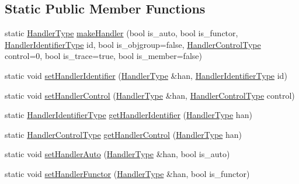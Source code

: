 \subsection*{Static Public Member Functions}
\begin{DoxyCompactItemize}
\item 
static \hyperlink{namespacevt_af64846b57dfcaf104da3ef6967917573}{Handler\+Type} \hyperlink{structvt_1_1_handler_manager_afcfe366a62c35d4fc843fd30f884968d}{make\+Handler} (bool is\+\_\+auto, bool is\+\_\+functor, \hyperlink{namespacevt_a59ae068fe828d1c33051ff96f3d016b6}{Handler\+Identifier\+Type} id, bool is\+\_\+objgroup=false, \hyperlink{namespacevt_adbbef13b92f0a93b14c219b7cc8a48f2}{Handler\+Control\+Type} control=0, bool is\+\_\+trace=true, bool is\+\_\+member=false)
\item 
static void \hyperlink{structvt_1_1_handler_manager_a5501e67dbd88836fecdf434548de0909}{set\+Handler\+Identifier} (\hyperlink{namespacevt_af64846b57dfcaf104da3ef6967917573}{Handler\+Type} \&han, \hyperlink{namespacevt_a59ae068fe828d1c33051ff96f3d016b6}{Handler\+Identifier\+Type} id)
\item 
static void \hyperlink{structvt_1_1_handler_manager_a8cfa04599d2bd111f1197b7bf2343a05}{set\+Handler\+Control} (\hyperlink{namespacevt_af64846b57dfcaf104da3ef6967917573}{Handler\+Type} \&han, \hyperlink{namespacevt_adbbef13b92f0a93b14c219b7cc8a48f2}{Handler\+Control\+Type} control)
\item 
static \hyperlink{namespacevt_a59ae068fe828d1c33051ff96f3d016b6}{Handler\+Identifier\+Type} \hyperlink{structvt_1_1_handler_manager_a1fc8635a26795f11f16f47eaf74b25a7}{get\+Handler\+Identifier} (\hyperlink{namespacevt_af64846b57dfcaf104da3ef6967917573}{Handler\+Type} han)
\item 
static \hyperlink{namespacevt_adbbef13b92f0a93b14c219b7cc8a48f2}{Handler\+Control\+Type} \hyperlink{structvt_1_1_handler_manager_a90bf2b080d44af243e5a35bf8836d161}{get\+Handler\+Control} (\hyperlink{namespacevt_af64846b57dfcaf104da3ef6967917573}{Handler\+Type} han)
\item 
static void \hyperlink{structvt_1_1_handler_manager_a9100f9e0e946b58d98d104a5cbcf5574}{set\+Handler\+Auto} (\hyperlink{namespacevt_af64846b57dfcaf104da3ef6967917573}{Handler\+Type} \&han, bool is\+\_\+auto)
\item 
static void \hyperlink{structvt_1_1_handler_manager_a25c8a39b9faea3e894021d5c6d52f903}{set\+Handler\+Functor} (\hyperlink{namespacevt_af64846b57dfcaf104da3ef6967917573}{Handler\+Type} \&han, bool is\+\_\+functor)
\item 

\end{DoxyCompactItemize}
